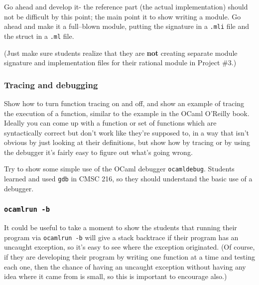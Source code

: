 \documentclass[12pt]{article}
\begin{document}
\begin{itemize}
                Go ahead and develop it- the reference part (the actual
                implementation) should not be difficult by this point; the
                main point it to show writing a module.  Go ahead and make
                it a full--blown module, putting the signature in a
                \texttt{.mli} file and the struct in a \texttt{.ml} file.

                (Just make sure students realize that they are \textbf{not}
                creating separate module signature and implementation files
                for their rational module in Project \#3.)

        \end{itemize}

        \vspace{-3.5mm}

      \subsubsection{Tracing and debugging}

        Show how to turn function tracing on and off, and show an example of
      tracing the execution of a function, similar to the example in the
      OCaml O'Reilly book.  Ideally you can come up with a function or set
      of functions which are syntactically correct but don't work like
      they're supposed to, in a way that isn't obvious by just looking at
      their definitions, but show how by tracing or by using the debugger
      it's fairly easy to figure out what's going wrong.

        Try to show some simple use of the OCaml debugger \texttt{ocamldebug}.
      Students learned and used \texttt{gdb} in CMSC 216, so they should
      understand the basic use of a debugger.

      \subsubsection{\texttt{ocamlrun -b}}

        It could be useful to take a moment to show the students that running
      their program via \texttt{ocamlrun -b} will give a stack backtrace if
      their program has an uncaught exception, so it's easy to see where the
      exception originated.  (Of course, if they are developing their
      program by writing one function at a time and testing each one, then
      the chance of having an uncaught exception without having any idea
      where it came from is small, so this is important to encourage also.)
\end{document}
